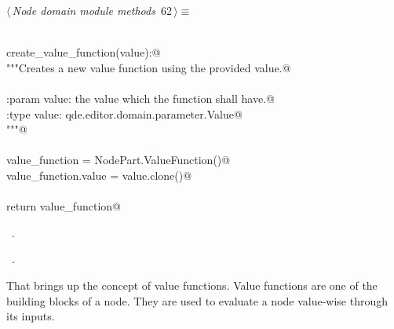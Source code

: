 \documentclass[
    a4paper,      %
    10pt,         %
    openright,    %
    notitlepage,  %
    parskip=half, %
]{scrreprt}       %
\theoremstyle{definition}                    %
\begin{document}
\begin{flushleft} \small
\begin{minipage}{\linewidth}\label{scrap103}\raggedright\small
{} $\langle\,${\itshape Node domain module methods}\nobreak\ {\footnotesize {62}}$\,\rangle\equiv$
\vspace{-1exm}
\begin{list}{}{} \item
\mbox{}\lstinline@@\\
\mbox{}\lstinline@def create_value_function(value):@\\
\mbox{}\lstinline@    """Creates a new value function using the provided value.@\\
\mbox{}\lstinline@@\\
\mbox{}\lstinline@    :param value: the value which the function shall have.@\\
\mbox{}\lstinline@    :type  value: qde.editor.domain.parameter.Value@\\
\mbox{}\lstinline@    """@\\
\mbox{}\lstinline@@\\
\mbox{}\lstinline@    value_function = NodePart.ValueFunction()@\\
\mbox{}\lstinline@    value_function.value = value.clone()@\\
\mbox{}\lstinline@@\\
\mbox{}\lstinline@    return value_function@\\
\mbox{}\lstinline@@{\NWsep}
\end{list}
\vspace{-1.5ex}
\footnotesize
\begin{list}{}{\setlength{\itemsep}{-\parsep}\setlength{\itemindent}{-\leftmargin}}
\item \NWtxtMacroDefBy\ .
\item \NWtxtMacroRefIn\ .

\item{}
\end{list}
\end{minipage}\vspace{4ex}
\end{flushleft}
That brings up the concept of value functions. Value functions are one of the
building blocks of a node. They are used to evaluate a node value-wise through
its inputs.
\end{document}
